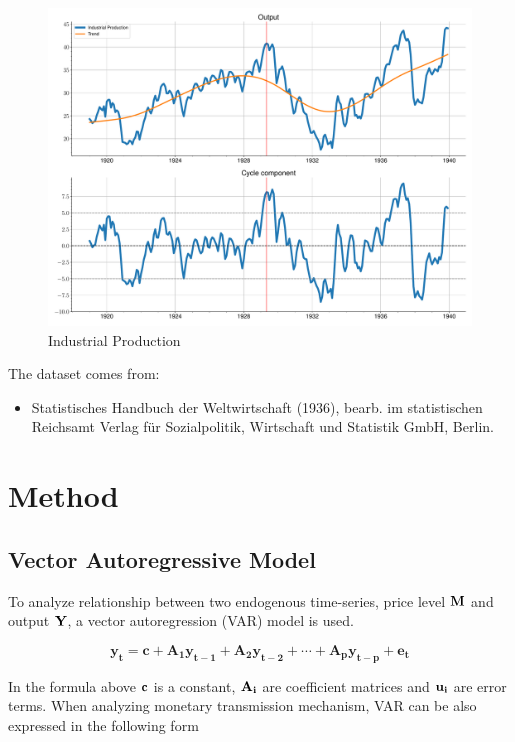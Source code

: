 \documentclass[a4paper,12pt]{article}
\begin{document}
\pagebreak

\begin{figure}[t]
    \centering
\caption{Industrial Production}
\label{fig:fig2}
    \includegraphics[width=\textwidth]{../output/figures/ts_IP.pdf} 
\end{figure}

The dataset comes from:
\begin{itemize}
		\item Statistisches Handbuch der Weltwirtschaft (1936), bearb. im statistischen Reichsamt
Verlag für Sozialpolitik, Wirtschaft und Statistik GmbH, Berlin.
\end{itemize}
 

\section{Method}
\subsection{Vector Autoregressive Model}

To analyze relationship between two endogenous time-series, price level \(\bf M\) and output \(\bf Y\), a vector autoregression (VAR) model is used.

\begin{equation} \label{eq:1}
		{\mathbf{y_{t}=c+A_{1}y_{{t-1}}+A_{2}y_{{t-2}}+\cdots +A_{p}y_{{t-p}}+e_{t}}}
\end{equation}

In the formula above \(\bf c\) is a constant, \(\bf A_i\) are coefficient matrices and \(\bf u_i\) are error terms. When analyzing monetary transmission mechanism, VAR can be also expressed in the following form \citep{favero2001}
\end{document}
